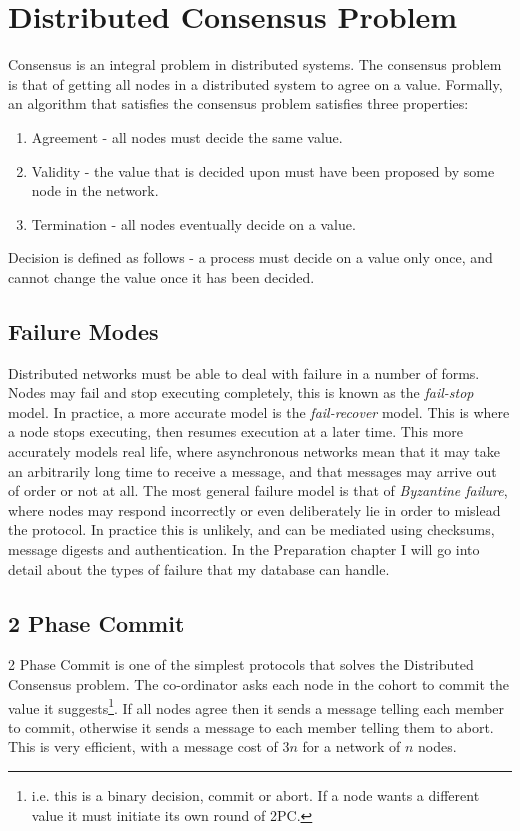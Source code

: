 \documentclass[12pt,twoside,notitlepage]{report}
\begin{document}
\section{Distributed Consensus Problem}

Consensus is an integral problem in distributed systems. The consensus problem is that of getting
all nodes in a distributed system to agree on a value. Formally, an algorithm that satisfies the
consensus problem satisfies three properties:

\begin{enumerate}
\item Agreement - all nodes must decide the same value.
\item Validity - the value that is decided upon must have been proposed by some node in the
	network.
\item Termination - all nodes eventually decide on a value.
\end{enumerate}

Decision is defined as follows - a process must decide on a value only once, and cannot change the
value once it has been decided.

\subsection*{Failure Modes}

Distributed networks must be able to deal with failure in a number of forms. Nodes may fail and
stop executing completely, this is known as the \emph{fail-stop} model. In practice, a more accurate
model is the \emph{fail-recover} model. This is where a node stops executing, then resumes execution
at a later time. This more accurately models real life, where asynchronous networks mean that it
may take an arbitrarily long time to receive a message, and that messages may arrive out of order
or not at all. The most general failure model is that of \emph{Byzantine failure}, where nodes may
respond incorrectly or even deliberately lie in order to mislead the protocol. In practice this is
unlikely, and can be mediated using checksums, message digests and authentication. In the
Preparation chapter I will go into detail about the types of failure that my database can handle.

\subsection*{2 Phase Commit}

2 Phase Commit is one of the simplest protocols that solves the Distributed Consensus problem. The
co-ordinator asks each node in the cohort to commit the value it suggests\footnote{i.e. this is
a binary decision, commit or abort. If a node wants a different value it must initiate its own
round of 2PC.}. If all nodes agree then it sends a message telling each member to commit, otherwise
it sends a message to each member telling them to abort. This is very efficient, with a message
cost of $3n$ for a network of $n$ nodes.
\end{document}
